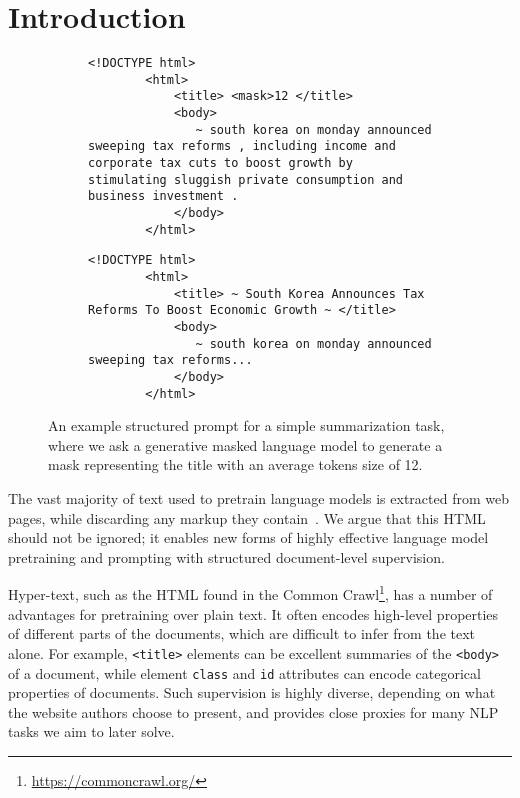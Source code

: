 \documentclass[11pt,a4paper]{article}
\begin{document}
\section{Introduction}
\begin{figure}
\centering
\begin{subfigure}[b]{0.45\textwidth}
   \centering
    \begin{lstlisting}[numbers=none, basicstyle=\tiny\ttfamily]
        <!DOCTYPE html>
        <html>
            <title> <mask>12 </title>
            <body>
               ~ south korea on monday announced sweeping tax reforms , including income and corporate tax cuts to boost growth by stimulating sluggish private consumption and business investment .
            </body>
        </html>
    \end{lstlisting}
    
\end{subfigure}
\begin{subfigure}[b]{0.45\textwidth}
   \centering
   \begin{lstlisting}[numbers=none, basicstyle=\tiny\ttfamily]
        <!DOCTYPE html>
        <html>
            <title> ~ South Korea Announces Tax Reforms To Boost Economic Growth ~ </title>
            <body>
               ~ south korea on monday announced sweeping tax reforms...
            </body>
        </html>
    \end{lstlisting}
\end{subfigure}

\caption{An example structured prompt for a simple summarization task, where we ask a generative masked language model to generate a mask representing the title with an average tokens size of 12.}
\label{fig:example_prompt}
\end{figure}


The vast majority of text used to pretrain language models is extracted from web pages, while discarding any markup they contain~\cite{ROBERTA,gpt3,T5,BART}. We argue that this HTML should not be ignored; it enables new forms of highly effective language model pretraining and prompting with structured document-level supervision.

Hyper-text, such as the HTML found in the Common Crawl\footnote{\url{https://commoncrawl.org/}}, has a number of advantages for pretraining over plain text. It often encodes high-level properties of different parts of the documents, which are difficult to infer from the text alone. For example, \verb+<title>+ elements can be excellent summaries of the \verb+<body>+ of a document, while element \verb+class+ and \verb+id+ attributes can encode categorical properties of  documents. Such supervision is highly diverse, depending on what the website authors choose to present, and provides close proxies for many NLP tasks we aim to later solve. 
\end{document}
